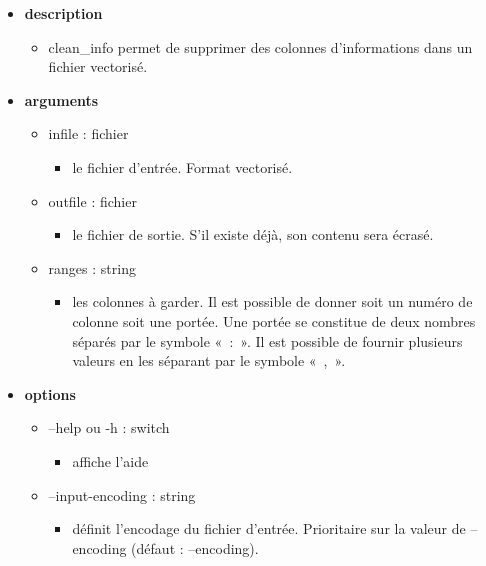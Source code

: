\documentclass[manual-fr.tex]{subfiles}
\begin{document}
\begin{itemize}
    \item[] \textbf{description}
        \begin{itemize}
            \item[] clean\_info permet de supprimer des colonnes d'informations dans un fichier vectorisé.
        \end{itemize}
    \item[] \textbf{arguments}
        \begin{itemize}
            \item[] infile : fichier
                \begin{itemize}
                    \item[] le fichier d'entrée. Format vectorisé.
                \end{itemize}
            \item[] outfile : fichier
                \begin{itemize}
                    \item[] le fichier de sortie. S'il existe déjà, son contenu sera écrasé.
                \end{itemize}
            \item[] ranges : string
                \begin{itemize}
                    \item[] les colonnes à garder. Il est possible de donner soit un numéro de colonne soit une portée. Une portée
                        se constitue de deux nombres séparés par le symbole «~:~». Il est possible de fournir plusieurs valeurs
                        en les séparant par le symbole  «~,~».
                \end{itemize}
        \end{itemize}
    \item[] \textbf{options}
        \begin{itemize}
            \item[] --help ou -h : switch
                \begin{itemize}
                    \item[] affiche l'aide
                \end{itemize}
            \item[] --input-encoding : string
                \begin{itemize}
                    \item[] définit l'encodage du fichier d'entrée. Prioritaire sur la valeur de --encoding (défaut : --encoding).

\end{itemize}
\end{itemize}
\end{itemize}
\end{document}
